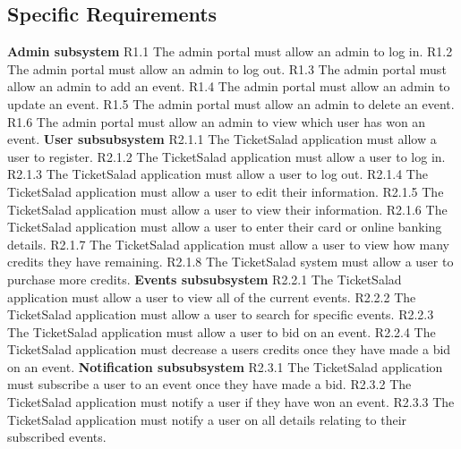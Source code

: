\documentclass[11pt]{article}
\begin{document}
	\subsection{Specific Requirements}
	\textbf{Admin subsystem}
	\newline
	R1.1 The admin portal must allow an admin to log in.
	\newline
	R1.2 The admin portal must allow an admin to log out.
	\newline
	R1.3 The admin portal must allow an admin to add an event.
	\newline
	R1.4 The admin portal must allow an admin to update an event.
	\newline
	R1.5 The admin portal must allow an admin to delete an event.
	\newline
	R1.6 The admin portal must allow an admin to view which user has won an event.
	\newline
	\newline
	\textbf{User subsubsystem}
	\newline
	R2.1.1 The TicketSalad application must allow a user to register.
	\newline
	R2.1.2 The TicketSalad application must allow a user to log in.
	\newline
	R2.1.3 The TicketSalad application must allow a user to log out.
	\newline
	R2.1.4 The TicketSalad application must allow a user to edit their information.
	\newline
	R2.1.5 The TicketSalad application must allow a user to view their information.
	\newline
	R2.1.6 The TicketSalad application must allow a user to enter their card or online banking details.
	\newline 
	R2.1.7 The TicketSalad application must allow a user to view how many credits they have remaining.
	\newline
	R2.1.8 The TicketSalad system must allow a user to purchase more credits.
	\newline
	\newline
	\textbf{Events subsubsystem}
	\newline
	R2.2.1 The TicketSalad application must allow a user to view all of the current events.
	\newline
	R2.2.2 The TicketSalad application must allow a user to search for specific events.
	\newline
	R2.2.3 The TicketSalad application must allow a user to bid on an event.
	\newline 
	R2.2.4 The TicketSalad application must decrease a users credits once they have made a bid on an event.
	\newline
	\newline
	\textbf{Notification subsubsystem}
	\newline
	R2.3.1 The TicketSalad application must subscribe a user to an event once they have made a bid.
	\newline
	R2.3.2 The TicketSalad application must notify a user if they have won an event.
	\newline
	R2.3.3 The TicketSalad application must notify a user on all details relating to their subscribed events.
	\newline	
\end{document}
